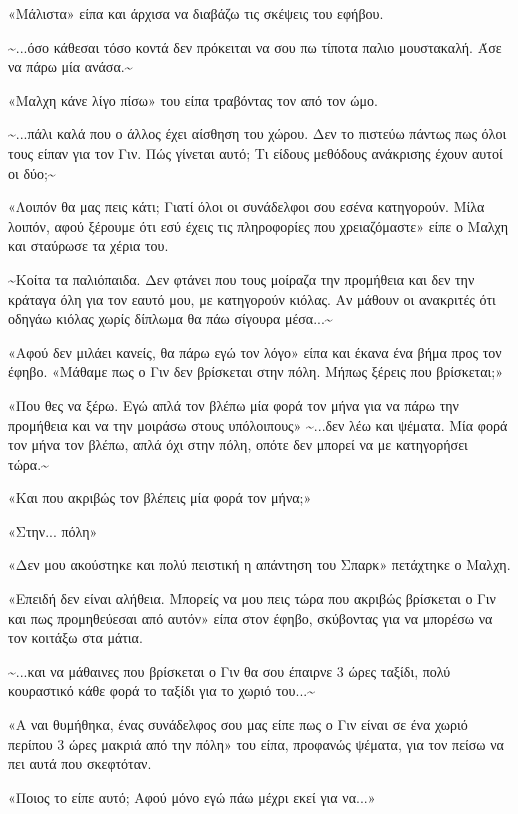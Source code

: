 \documentclass[12pt,twoside, openany]{book}
\begin{document}
«Μάλιστα» είπα και άρχισα να διαβάζω τις σκέψεις του εφήβου.

\textasciitilde ...όσο κάθεσαι τόσο κοντά δεν πρόκειται να σου πω τίποτα παλιο μουστακαλή. Άσε να πάρω μία ανάσα.\textasciitilde 

«Μαλχη κάνε λίγο πίσω» του είπα τραβόντας τον από τον ώμο.

\textasciitilde ...πάλι καλά που ο άλλος έχει αίσθηση του χώρου. Δεν το πιστεύω πάντως πως όλοι τους είπαν για τον Γιν. Πώς γίνεται αυτό; Τι είδους μεθόδους ανάκρισης έχουν αυτοί οι δύο;\textasciitilde 

«Λοιπόν θα μας πεις κάτι; Γιατί όλοι οι συνάδελφοι σου εσένα κατηγορούν. Μίλα λοιπόν, αφού ξέρουμε ότι εσύ έχεις τις πληροφορίες που χρειαζόμαστε» είπε ο Μαλχη και σταύρωσε τα χέρια του.

\textasciitilde Κοίτα τα παλιόπαιδα. Δεν φτάνει που τους μοίραζα την προμήθεια και δεν την κράταγα όλη για τον εαυτό μου, με κατηγορούν κιόλας. Αν μάθουν οι ανακριτές ότι οδηγάω κιόλας χωρίς δίπλωμα θα πάω σίγουρα μέσα...\textasciitilde 

«Αφού δεν μιλάει κανείς, θα πάρω εγώ τον λόγο» είπα και έκανα ένα βήμα προς τον έφηβο. «Μάθαμε πως ο Γιν δεν βρίσκεται στην πόλη. Μήπως ξέρεις που βρίσκεται;»

«Που θες να ξέρω. Εγώ απλά τον βλέπω μία φορά τον μήνα για να πάρω την προμήθεια και να την μοιράσω στους υπόλοιπους» \textasciitilde ...δεν λέω και ψέματα. Μία φορά τον μήνα τον βλέπω, απλά όχι στην πόλη, οπότε δεν μπορεί να με κατηγορήσει τώρα.\textasciitilde 

«Και που ακριβώς τον βλέπεις μία φορά τον μήνα;»

«Στην... πόλη»

«Δεν μου ακούστηκε και πολύ πειστική η απάντηση του Σπαρκ» πετάχτηκε ο Μαλχη.

«Επειδή δεν είναι αλήθεια. Μπορείς να μου πεις τώρα που ακριβώς βρίσκεται ο Γιν και πως προμηθεύεσαι από αυτόν» είπα στον έφηβο, σκύβοντας για να μπορέσω να τον κοιτάξω στα μάτια.

\textasciitilde ...και να μάθαινες που βρίσκεται ο Γιν θα σου έπαιρνε 3 ώρες ταξίδι, πολύ κουραστικό κάθε φορά το ταξίδι για το χωριό του...\textasciitilde 

«Α ναι θυμήθηκα, ένας συνάδελφος σου μας είπε πως ο Γιν είναι σε ένα χωριό περίπου 3 ώρες μακριά από την πόλη» του είπα, προφανώς ψέματα, για τον πείσω να πει αυτά που σκεφτόταν.

«Ποιος το είπε αυτό; Αφού μόνο εγώ πάω μέχρι εκεί για να...»
\end{document}
